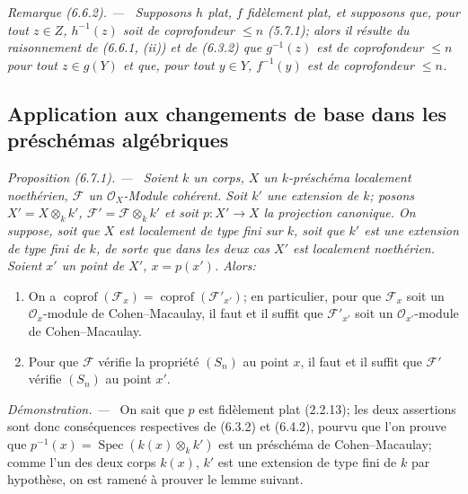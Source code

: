 \documentclass[10pt,oneside]{book}
\newcommand{\oldpage}[2][]{%
  \setcounter{footnote}{0}%
  \marginpar{\scriptsize\textbf{#1}~|~#2}\ignorespaces}
\newenvironment{proposition}[1][]{%
  \par\medskip\noindent\itshape Proposition (#1). ---\ }{\par}
\newenvironment{remark}[1][]{%
  \par\medskip\noindent\itshape Remarque (#1). ---\ }{\par}
\newenvironment{proof}{%
  \par\medskip\noindent\textit{Démonstration. ---\ }}{\par}
\begin{document}
\begin{remark}[6.6.2]
\label{IV.2.s6.6.2-fr}
Supposons $h$ plat, $f$ fidèlement plat, et supposons que, pour tout
$z\in Z$, $h^{-1}(z)$ soit de coprofondeur $\leqslant n$ (5.7.1); alors
il résulte du raisonnement de (6.6.1, (ii)) et de (6.3.2) que
$g^{-1}(z)$ est de coprofondeur $\leqslant n$ pour tout $z\in g(Y)$ et
que, pour tout $y\in Y$, $f^{-1}(y)$ est de coprofondeur $\leqslant n$.
\end{remark}

\oldpage[IV-2]{146}

\subsection{Application aux changements de base dans les préschémas algébriques}

\begin{proposition}[6.7.1]
\label{IV.2.s6.7.1-fr}
Soient $k$ un corps, $X$ un $k$-préschéma localement noethérien,
$\mathscr F$ un $\mathcal O_X$-Module cohérent. Soit $k'$ une extension
de $k$; posons $X'=X\otimes_k k'$, $\mathscr F'=\mathscr F\otimes_k k'$
et soit $p:X'\to X$ la projection canonique. On suppose, soit que
$X$ est localement de type fini sur $k$, soit que $k'$ est une extension
de type fini de $k$, de sorte que dans les deux cas $X'$ est localement
noethérien. Soient $x'$ un point de $X'$, $x=p(x')$. Alors:
\begin{enumerate}
\item[(i)] On a $\operatorname{coprof}(\mathscr F_x)=
\operatorname{coprof}(\mathscr F'_{x'})$; en particulier, pour que
$\mathscr F_x$ soit un $\mathcal O_x$-module de Cohen--Macaulay, il
faut et il suffit que $\mathscr F'_{x'}$ soit un
$\mathcal O_{x'}$-module de Cohen--Macaulay.
\item[(ii)] Pour que $\mathscr F$ vérifie la propriété $(S_n)$ au point
$x$, il faut et il suffit que $\mathscr F'$ vérifie $(S_n)$ au point
$x'$.
\end{enumerate}
\end{proposition}

\begin{proof}
On sait que $p$ est fidèlement plat (2.2.13); les deux assertions sont
donc conséquences respectives de (6.3.2) et (6.4.2), pourvu que l'on
prouve que $p^{-1}(x)=\operatorname{Spec}(k(x)\otimes_k k')$ est un
préschéma de Cohen--Macaulay; comme l'un des deux corps $k(x)$, $k'$ est
une extension de type fini de $k$ par hypothèse, on est ramené à prouver
le lemme suivant.
\end{proof}
\end{document}
